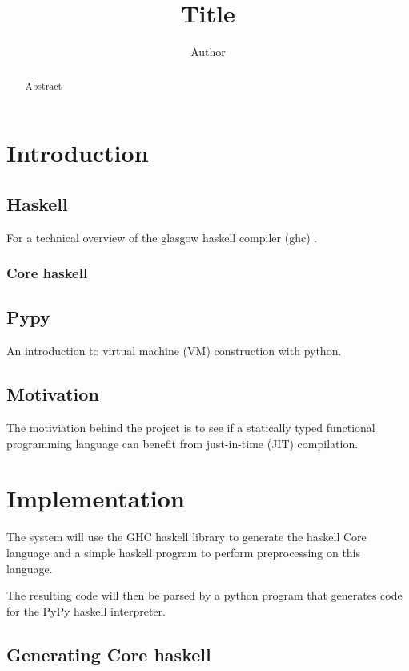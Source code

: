 \documentclass{article}
\begin{document}
\title{Title}
\author{Author}
\maketitle

\begin{abstract}
Abstract
\end{abstract}

\clearpage


\section{Introduction}

\subsection{Haskell}

For a technical overview of the glasgow haskell compiler (ghc) \cite{ghc}.

\subsubsection{Core haskell}

\subsection{Pypy}

An introduction to virtual machine (VM) construction with python\cite{pypy}.

\subsection{Motivation}

The motiviation behind the project is to see if a statically typed functional 
programming language can benefit from just-in-time (JIT) compilation.

\section{Implementation}

The system will use the GHC haskell library to generate the haskell Core language
and a simple haskell program to perform preprocessing on this language.

The resulting code will then be parsed by a python program that generates code for the
PyPy haskell interpreter.

\subsection{Generating Core haskell}
\end{document}
